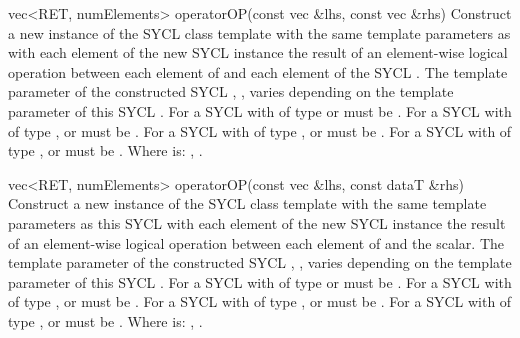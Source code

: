   \addRow
  {vec<RET, numElements> operatorOP(const vec \&lhs, const vec \&rhs)}
  {
    Construct a new instance of the SYCL  class template with the same template parameters as   with each element of the new SYCL  instance the result of an element-wise  logical operation between each element of   and each element of the  SYCL .
    \newline \newline
    The  template parameter of the constructed SYCL , , varies depending on the  template parameter of this SYCL . For a SYCL  with  of type  or   must be . For a SYCL  with  of type ,  or   must be . For a SYCL  with  of type ,  or   must be . For a SYCL  with  of type ,  or   must be .
    \newline \newline
    Where  is: \codeinline{\&\&}, \codeinline{\|\|}.
  }

  \addRow
  {vec<RET, numElements> operatorOP(const vec \&lhs, const dataT \&rhs)}
  {
    Construct a new instance of the SYCL  class template with the same template parameters as this SYCL  with each element of the new SYCL  instance the result of an element-wise  logical operation between each element of   and the  scalar.
    \newline \newline
    The  template parameter of the constructed SYCL , , varies depending on the  template parameter of this SYCL . For a SYCL  with  of type  or   must be . For a SYCL  with  of type ,  or   must be . For a SYCL  with  of type ,  or   must be . For a SYCL  with  of type ,  or   must be .
    \newline \newline
    Where  is: \codeinline{\&\&}, \codeinline{\|\|}.
  }


